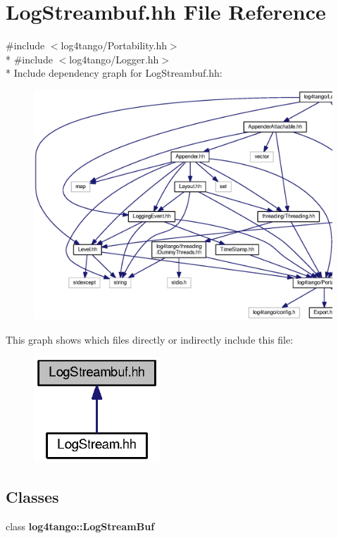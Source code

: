 \section{Log\-Streambuf.\-hh File Reference}
\label{LogStreambuf_8hh}
{\ttfamily \#include $<$log4tango/\-Portability.\-hh$>$}\\*
{\ttfamily \#include $<$log4tango/\-Logger.\-hh$>$}\\*
Include dependency graph for Log\-Streambuf.\-hh\-:
\nopagebreak
\begin{figure}[H]
\begin{center}
\leavevmode
\includegraphics[width=350pt]{d3/dcc/LogStreambuf_8hh__incl}
\end{center}
\end{figure}
This graph shows which files directly or indirectly include this file\-:
\nopagebreak
\begin{figure}[H]
\begin{center}
\leavevmode
\includegraphics[width=134pt]{d4/dc2/LogStreambuf_8hh__dep__incl}
\end{center}
\end{figure}
\subsection*{Classes}
\begin{DoxyCompactItemize}
\item 
class {\bf log4tango\-::\-Log\-Stream\-Buf}
\end{DoxyCompactItemize}
